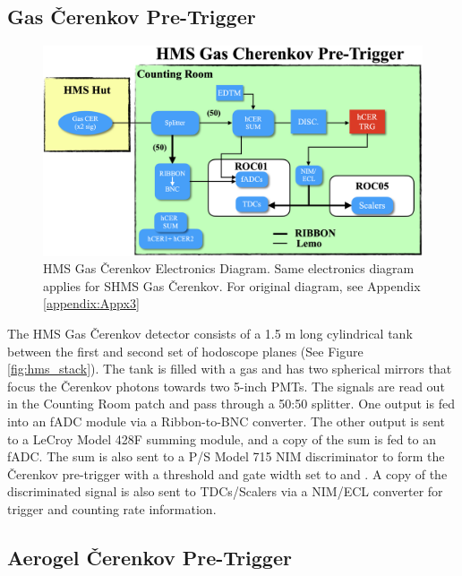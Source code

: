 \documentclass[11pt]{article}
\begin{document}
\subsection{Gas \v{C}erenkov Pre-Trigger} \label{hms_cer_section}
\begin{figure}[h!]
  \centering
  \includegraphics[scale=0.35]{./hCER_diagram.png}
  \caption{HMS Gas \v{C}erenkov Electronics Diagram. Same electronics diagram applies for SHMS Gas \v{C}erenkov. For original diagram, see Appendix \ref{appendix:Appx3} }
  \label{fig:hCER_diagram}
\end{figure}

\indent The HMS Gas \v{C}erenkov detector consists of a 1.5 m long cylindrical tank between the first and second set of hodoscope planes (See Figure \ref{fig:hms_stack}).
The tank is filled with a gas and has two spherical mirrors that focus the \v{C}erenkov photons towards two 5-inch PMTs\cite{hms_cer_article}. The
signals are read out in the Counting Room patch and pass through a 50:50 splitter. One output is fed into
an fADC module via a Ribbon-to-BNC converter. The other output is sent to a LeCroy Model 428F summing module, and a copy of the sum is fed to an fADC. The sum is
also sent to a P/S Model 715 NIM discriminator to form the \v{C}erenkov pre-trigger with a threshold and gate width set to \hcerthrs and \hcergate. A copy of the discriminated signal is also sent to TDCs/Scalers via a NIM/ECL converter for trigger and counting rate information.


\subsection{Aerogel \v{C}erenkov Pre-Trigger}
\end{document}
